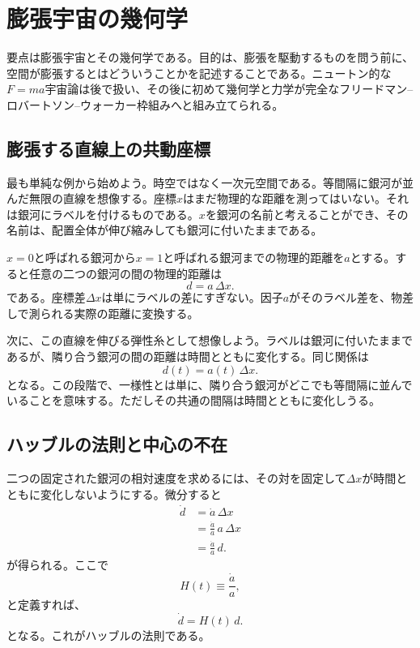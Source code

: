 \chapter{膨張宇宙の幾何学}

要点は膨張宇宙とその幾何学である。目的は、膨張を駆動するものを問う前に、空間が膨張するとはどういうことかを記述することである。ニュートン的な\(F=ma\)宇宙論は後で扱い、その後に初めて幾何学と力学が完全なフリードマン--ロバートソン--ウォーカー枠組みへと組み立てられる。

\section{膨張する直線上の共動座標}

最も単純な例から始めよう。時空ではなく一次元空間である。等間隔に銀河が並んだ無限の直線を想像する。座標\(x\)はまだ物理的な距離を測ってはいない。それは銀河にラベルを付けるものである。\(x\)を銀河の名前と考えることができ、その名前は、配置全体が伸び縮みしても銀河に付いたままである。

\(x=0\)と呼ばれる銀河から\(x=1\)と呼ばれる銀河までの物理的距離を\(a\)とする。すると任意の二つの銀河の間の物理的距離は
\begin{equation}
d=a\,\Delta x.
\end{equation}
である。座標差\(\Delta x\)は単にラベルの差にすぎない。因子\(a\)がそのラベル差を、物差しで測られる実際の距離に変換する。

次に、この直線を伸びる弾性糸として想像しよう。ラベルは銀河に付いたままであるが、隣り合う銀河の間の距離は時間とともに変化する。同じ関係は
\begin{equation}
d(t)=a(t)\,\Delta x.
\end{equation}
となる。この段階で、一様性とは単に、隣り合う銀河がどこでも等間隔に並んでいることを意味する。ただしその共通の間隔は時間とともに変化しうる。

\section{ハッブルの法則と中心の不在}

二つの固定された銀河の相対速度を求めるには、その対を固定して\(\Delta x\)が時間とともに変化しないようにする。微分すると
\begin{align}
\dot d &= \dot a\,\Delta x \\
       &= \frac{\dot a}{a}\,a\,\Delta x \\
       &= \frac{\dot a}{a}\,d.
\end{align}
が得られる。ここで
\begin{equation}
H(t)\equiv \frac{\dot a}{a},
\end{equation}
と定義すれば、
\begin{equation}
\dot d = H(t)\,d.
\end{equation}
となる。これがハッブルの法則である。

